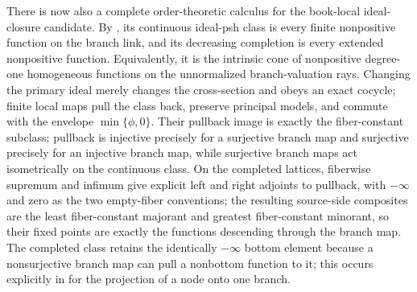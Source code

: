 There is now also a complete order-theoretic calculus for the book-local
ideal-closure candidate.  By
, its continuous ideal-psh
class is every finite nonpositive function on the branch link, and its
decreasing completion is every extended nonpositive function.  Equivalently,
it is the intrinsic cone of nonpositive degree-one homogeneous functions on
the unnormalized branch-valuation rays.  Changing the primary ideal merely
changes the cross-section and obeys an exact cocycle; finite local maps pull
the class back, preserve principal models, and commute with the envelope
\(\min\{\phi,0\}\).  Their pullback image is exactly the fiber-constant
subclass; pullback is injective precisely for a surjective branch map and
surjective precisely for an injective branch map, while surjective branch
maps act isometrically on the continuous class.  On the completed lattices,
fiberwise supremum and infimum give explicit left and right adjoints to
pullback, with \(-\infty\) and zero as the two empty-fiber conventions; the
resulting source-side composites are the least fiber-constant majorant and
greatest fiber-constant minorant, so their fixed points are exactly the
functions descending through the branch map.
The completed class retains
the identically
\(-\infty\) bottom element because a nonsurjective branch map can pull a
nonbottom function to it; this occurs explicitly in
 for the projection of a node onto
one branch.

